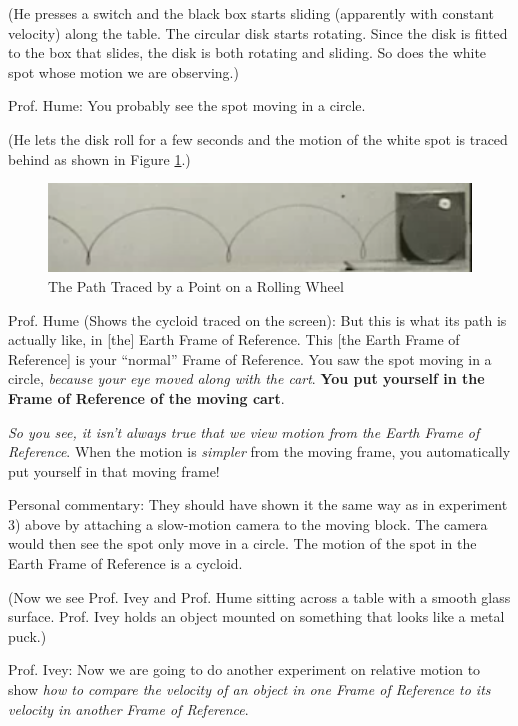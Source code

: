 \documentclass[a6paper]{article}
\begin{document}
(He presses a switch and the black box starts sliding (apparently with constant velocity) along the table. The circular disk starts rotating. Since the disk is fitted to the box that slides, the disk is both rotating and sliding. So does the white spot whose motion we are observing.)

Prof. Hume: You probably see the spot moving in a circle. 

(He lets the disk roll for a few seconds and the motion of the white spot is traced behind as shown in Figure \ref{fig: prof-hume-cycloid-2}.)
        \begin{figure}[h!]
            \centering
            \includegraphics[width=0.7\linewidth]{prof-hume-cycloid-2.png}
            \caption{The Path Traced by a Point on a Rolling Wheel}
            \label{fig: prof-hume-cycloid-2}
        \end{figure}

Prof. Hume (Shows the cycloid traced on the screen): But this is what its path is actually like, in [the] Earth Frame of Reference. This [the Earth Frame of Reference] is your ``normal'' Frame of Reference. You saw the spot moving in a circle, \emph{because your eye moved along with the cart}. \textbf{You put yourself in the Frame of Reference of the moving cart}. 

\emph{So you see, it isn't always true that we view motion from the Earth Frame of Reference}. When the motion is \emph{simpler} from the moving frame, you automatically put yourself in that moving frame! 

Personal commentary: They should have shown it the same way as in experiment 3) above by attaching a slow-motion camera to the moving block. The camera would then see the spot only move in a circle. The motion of the spot in the Earth Frame of Reference is a cycloid. 

(Now we see Prof. Ivey and Prof. Hume sitting across a table with a smooth glass surface. Prof. Ivey holds an object mounted on something that looks like a metal puck.)

Prof. Ivey: Now we are going to do another experiment on relative motion to show \emph{how to compare the velocity of an object in one Frame of Reference to its velocity in another Frame of Reference}.
\end{document}
